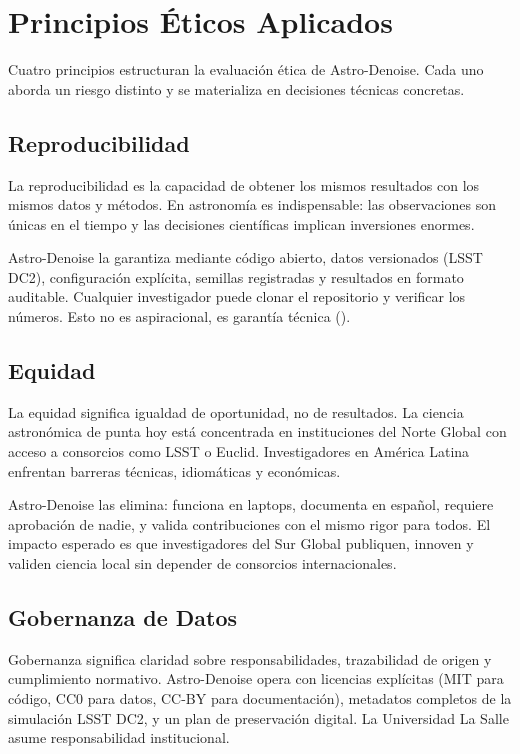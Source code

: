 \section{Principios Éticos Aplicados}

Cuatro principios estructuran la evaluación ética de Astro-Denoise. Cada uno aborda un riesgo distinto y se materializa en decisiones técnicas concretas.

\subsection{Reproducibilidad}

La reproducibilidad es la capacidad de obtener los mismos resultados con los mismos datos y métodos. En astronomía es indispensable: las observaciones son únicas en el tiempo y las decisiones científicas implican inversiones enormes.

Astro-Denoise la garantiza mediante código abierto, datos versionados (LSST DC2), configuración explícita, semillas registradas y resultados en formato auditable. Cualquier investigador puede clonar el repositorio y verificar los números. Esto no es aspiracional, es garantía técnica (\cite{harrison2017}).

\subsection{Equidad}

La equidad significa igualdad de oportunidad, no de resultados. La ciencia astronómica de punta hoy está concentrada en instituciones del Norte Global con acceso a consorcios como LSST o Euclid. Investigadores en América Latina enfrentan barreras técnicas, idiomáticas y económicas.

Astro-Denoise las elimina: funciona en laptops, documenta en español, requiere aprobación de nadie, y valida contribuciones con el mismo rigor para todos. El impacto esperado es que investigadores del Sur Global publiquen, innoven y validen ciencia local sin depender de consorcios internacionales.

\subsection{Gobernanza de Datos}

Gobernanza significa claridad sobre responsabilidades, trazabilidad de origen y cumplimiento normativo. Astro-Denoise opera con licencias explícitas (MIT para código, CC0 para datos, CC-BY para documentación), metadatos completos de la simulación LSST DC2, y un plan de preservación digital. La Universidad La Salle asume responsabilidad institucional.


